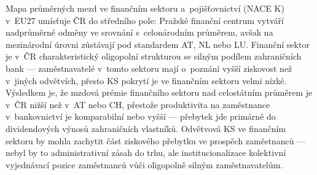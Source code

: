 Mapa průměrných mezd ve finančním sektoru a~pojišťovnictví (\ac{NACE} K) v~EU27 umísťuje ČR do středního pole: Pražské finanční centrum vytváří nadprůměrné odměny ve srovnání s~celonárodním průměrem, avšak na mezinárodní úrovni zůstávají pod standardem AT, NL nebo LU.
Finanční sektor je v~ČR charakteristický oligopolní strukturou se silným podílem zahraničních bank --- zaměstnavatelé v~tomto sektoru mají o~poznání vyšší ziskovost než v~jiných odvětvích, přesto \ac{KS} pokrytí je ve finančním sektoru velmi nízké.
Výsledkem je, že mzdová prémie finančního sektoru nad celostátním průměrem je v~ČR nižší než v~AT nebo CH, přestože produktivita na zaměstnance v~bankovnictví je komparabilní nebo vyšší --- přebytek jde primárně do dividendových výnosů zahraničních vlastníků.
Odvětvová \ac{KS} ve finančním sektoru by mohla zachytit část ziskového přebytku ve prospěch zaměstnanců --- nebyl by to administrativní zásah do trhu, ale institucionalizace kolektivní vyjednávací pozice zaměstnanců vůči oligopolně silným zaměstnavatelům.


